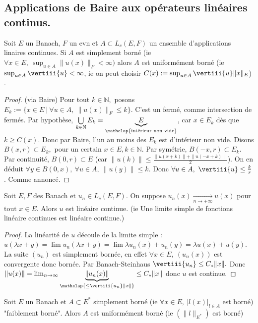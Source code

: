 \subsection{Applications de Baire aux opérateurs linéaires continus.}
\begin{theoreme}
    Soit $E$ un Banach, $F$ un evn et $A\subset L_c(E,F)$ un ensemble d'applications linaires continues. Si $A$ est simplement borné (ie $\forall x\in E,\ \sup_{u\in A}\|u(x)\|_F<\infty ) $ alors $A$ est uniformément borné (ie $\sup_{u\in A}\vertiii{u}<\infty $, ie on peut choisir $C(x):=\sup_{u\in A}\vertiii{u}\|x\|_E$) .
\end{theoreme}
\begin{proof}
    (via Baire) Pour tout $k\in \mathbb{N} ,$ posons $E_k:=\{x\in E\ |\ \forall u\in A,\ \|u(x)\|_F\le k \} $. C'est un fermé, comme intersection de fermés.
    Par hypothèse, $\bigcup\limits_{k\in \mathbb{N} } E_k=\underbrace{E}_{\mathclap{\text{intérieur non vide}}}$, car $x\in E_k$ dès que $k\ge C(x)$.
    Donc par Baire, l'un au moins des $E_k$ est d'intérieur non vide. 
    Disons $B(x,r)\subset E_k,$ pour un certain $x\in E,k\in \mathbb{N}$. 
    Par symétrie, $B(-x,r)\subset E_k$. 
    Par continuité, $B(0,r)\subset E$ (car $\|u(k)\|\le \frac{\|u(x+k)\|+\|u(-x+k)\|}{2}$). 
    On en déduit $\forall y\in B(0,x),\ \forall u\in A,\ \|u(y)\|\le k$.
    Donc $\forall u\in A,\ \vertiii{u}\le \frac{k}{r}$.
    Comme annoncé.
\end{proof}
\begin{corollaire}
    Soit $E,F$ des Banach et $u_n\in L_c(E,F).$ On suppose $u_n(x)\underset{n\to +\infty}{\longrightarrow} u(x)$ pour tout $x\in E.$ Alors $u$ est linéaire continue. (ie Une limite simple de fonctions linéaire continues est linéaire continue.)
\end{corollaire}
\begin{proof}
    La linéarité de $u$ découle de la limite simple : $u(\lambda x+y)=\lim u_n(\lambda x+y)=\lim \lambda u_n(x)+u_n(y)=\lambda u(x)+u(y)$.\\
    La suite $(u_n)$ est simplement bornée, en effet $\forall x\in E,\ (u_n(x)) $ est convergente donc bornée. Par Banach-Steinhaus $\vertiii{u_n}\le C_*\|x\|.$ Donc $\|u(x)\|=\lim_{n\to \infty }\underbrace{\|u_n(x)\|}_{\mathclap{\substack{\le \vertiii{u_n}\|x\|}}}\le C_*\|x\|$ donc $u$ est continue.
\end{proof}
\begin{corollaire}
    Soit $E$ un Banach et $A\subset E^*$ simplement borné (ie $\forall x\in E,\ |l(x)|_{l\in A} $ est borné) "faiblement borné". Alors $A$ est uniformément borné (ie $(\|l\|_{E^*})$ est borné)
\end{corollaire}

